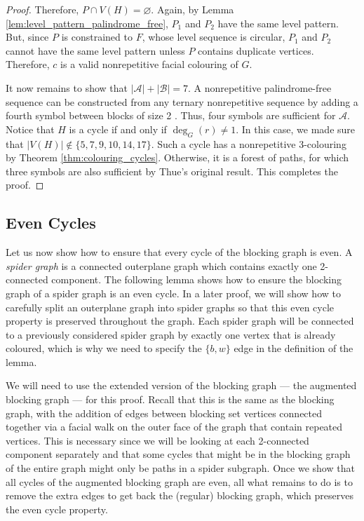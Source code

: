 \documentclass{patmorin}
\let\emptyset\varnothing
\begin{document}
\begin{proof}
 Therefore, $P \cap V(H) = \emptyset$. Again, by Lemma \ref{lem:level_pattern_palindrome_free}, $P_1$ and $P_2$ have the same level pattern. But, since $P$ is constrained to $F$, whose level sequence is circular, $P_1$ and $P_2$ cannot have the same level pattern unless $P$ contains duplicate vertices. Therefore, $c$ is a valid nonrepetitive facial colouring of $G$.
 
 It now remains to show that $|\mathcal{A}|+|\mathcal{B}|=7$. A nonrepetitive palindrome-free sequence can be constructed from any ternary nonrepetitive sequence by adding a fourth symbol between blocks of size 2 \cite{brevsar2007nonrepetitive}. Thus, four symbols are sufficient for $\mathcal{A}$. Notice that $H$ is a cycle if and only if $\deg_G(r)\not=1$. In this case, we made sure that $|V(H)| \notin \{5,7,9,10,14,17\}$. Such a cycle has a nonrepetitive 3-colouring by Theorem \ref{thm:colouring_cycles}. Otherwise, it is a forest of paths, for which three symbols are also sufficient by Thue's original result. This completes the proof. 	
\end{proof}


\subsection{Even Cycles}
Let us now show how to ensure that every cycle of the blocking graph is even. A \emph{spider graph} is a connected outerplane graph which contains exactly one 2-connected component. The following lemma shows how to ensure the blocking graph of a spider graph is an even cycle. In a later proof, we will show how to carefully split an outerplane graph into spider graphs so that this even cycle property is preserved throughout the graph. Each spider graph will be connected to a previously considered spider graph by exactly one vertex that is already coloured, which is why we need to specify the $\{b,w\}$ edge in the definition of the lemma. 

We will need to use the extended version of the blocking graph --- the augmented blocking graph --- for this proof. Recall that this is the same as the blocking graph, with the addition of edges between blocking set vertices connected together via a facial walk on the outer face of the graph that contain repeated vertices. This is necessary since we will be looking at each 2-connected component separately and that some cycles that might be in the blocking graph of the entire graph might only be paths in a spider subgraph. Once we show that all cycles of the augmented blocking graph are even, all what remains to do is to remove the extra edges to get back the (regular) blocking graph, which preserves the even cycle property.
\end{document}
